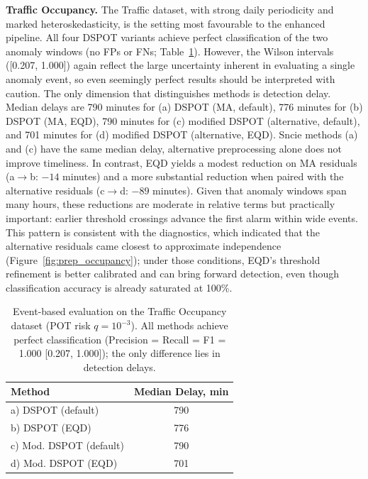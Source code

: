 \documentclass{statsmsc}
\begin{document}
\noindent\textbf{Traffic Occupancy.} The Traffic dataset, with strong daily periodicity and marked heteroskedasticity, 
is the setting most favourable to the 
enhanced pipeline. All four DSPOT variants achieve perfect classification of the two anomaly windows (no FPs or FNs; 
Table~\ref{tab:traffic_event_metrics}). However, the Wilson intervals ([0.207, 1.000]) again reflect the large uncertainty
inherent in evaluating a single anomaly event, so even seemingly perfect results should be interpreted with caution. 
The only dimension that distinguishes methods is detection delay.
Median delays are 790 minutes for (a) DSPOT (MA, default), 776 minutes for (b) DSPOT (MA, EQD), 790 minutes for (c) 
modified DSPOT (alternative, default), and 701 minutes for (d) modified DSPOT (alternative, EQD).
Sncie methods  (a) and (c) have the same median delay, alternative preprocessing alone does not improve timeliness. 
In contrast, EQD yields a modest reduction on MA residuals (a$\to$b: $-14$ minutes) and a more substantial reduction when 
paired with the alternative residuals (c$\to$d: $-89$ minutes). Given that anomaly windows span many hours, these reductions
are moderate in relative terms but practically important: earlier threshold crossings advance the first alarm within wide 
events. This pattern is consistent with the diagnostics, which indicated that the alternative residuals came closest 
to approximate independence (Figure~\ref{fig:prep_occupancy}); under those conditions, EQD’s threshold refinement 
is better calibrated and can bring forward detection, even though classification accuracy is already saturated at 100\%.

\begin{table}[ht]
\centering
\caption{Event-based evaluation on the Traffic Occupancy dataset (POT risk $q{=}10^{-3}$). 
All methods achieve perfect classification (Precision = Recall = F1 = 1.000 [0.207, 1.000]); 
the only difference lies in detection delays.}
\label{tab:traffic_event_metrics}

\begingroup
\setlength{\tabcolsep}{4pt}        %
\renewcommand{\arraystretch}{1.15} %
\footnotesize

\begin{tabular}{|l|c|}
\hline
Method & Median Delay, min \\
\hline
a) DSPOT (default)        & 790 \\
b) DSPOT (EQD)            & 776 \\
c) Mod. DSPOT (default)   & 790 \\
d) Mod. DSPOT (EQD)       & 701 \\
\hline
\end{tabular}
\endgroup
\end{table}
\end{document}
